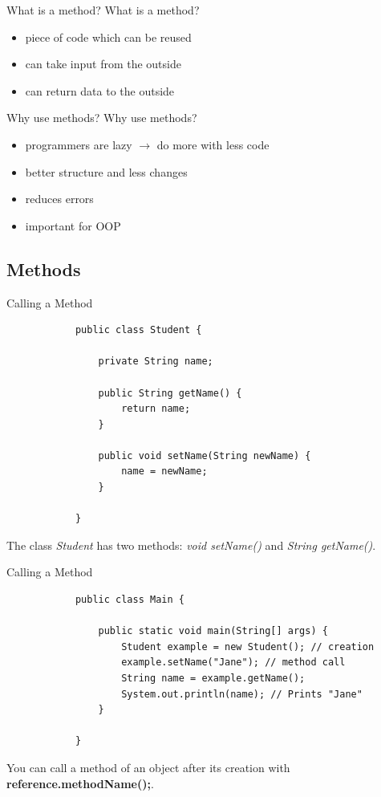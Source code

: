 	\begin{frame}{What is a method?}
		What is a method?
		\begin{itemize}
			\item<1-> piece of code which can be reused
			\item<2-> can take input from the outside
			\item<3-> can return data to the outside
		\end{itemize}
	\end{frame}
	
	\begin{frame}{Why use methods?}
		Why use methods?
		\begin{itemize}
			\item<1-> programmers are lazy $\rightarrow$ do more with less code
			\item<2-> better structure and less changes
			\item<3-> reduces errors
			\item<4-> important for OOP
		\end{itemize}
		
	\end{frame}
	
	\subsection{Methods}
	\begin{frame}[fragile]{Calling a Method}
		\begin{lstlisting}
			public class Student {
				
				private String name;
				
				public String getName() {
					return name;
				}
				
				public void setName(String newName) {
					name = newName;
				}
				
			}
		\end{lstlisting}
		The class \emph{Student} has two methods: \emph{void setName()} and \emph{String getName()}.
	\end{frame}
	
	\begin{frame}[fragile]{Calling a Method}
		\begin{lstlisting}
			public class Main {
				
				public static void main(String[] args) {
					Student example = new Student(); // creation
					example.setName("Jane"); // method call
					String name = example.getName(); 
					System.out.println(name); // Prints "Jane"
				}
				
			}
		\end{lstlisting}
		You can call a method of an object after its creation with \textbf{reference.methodName();}.
	\end{frame}
	
